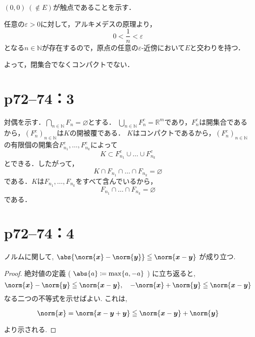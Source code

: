 \begin{tanswer}
    $(0,0)~(\notin E)$が触点であることを示す．

    任意の$\varepsilon >0$に対して，アルキメデスの原理より，
    \[
        0 < \frac{1}{n} < \varepsilon
    \]
    となる$n \in \mathbb{N}$が存在するので，原点の任意の$\varepsilon$-近傍において$E$と交わりを持つ．

    よって，閉集合でなくコンパクトでない．
\end{tanswer}


\newpage
\section*{p72--74：3}
\begin{tproof}
    対偶を示す．$\bigcap_{n \in \mathbb{N}}F_n = \varnothing$とする．
    $\bigcup_{n \in \mathbb{N}}F_n^c = \mathbb{R}^m$であり，$F_n^c$は開集合であるから，$(F_n^c)_{n \in \mathbb{N}}$は$K$の開被覆である．
    $K$はコンパクトであるから，$(F_n^c)_{n \in \mathbb{N}}$の有限個の開集合$F_{n_1}^c,\ldots,F_{n_k}^c$によって
    \[
        K \subset F_{n_1}^c \cup \ldots \cup F_{n_k}^c
    \]
    とできる．したがって，
    \[
        K \cap F_{n_1} \cap \ldots \cap F_{n_k} = \varnothing
    \]
    である．$K$は$F_{n_1},\ldots,F_{n_k}$をすべて含んでいるから，
    \[
        F_{n_1} \cap \ldots \cap F_{n_k} = \varnothing
    \]
    である．
\end{tproof}

\newpage

\section*{p72--74：4}

\begin{lemma}{}{}
    ノルムに関して, $\abs{\norm{ \bm{x}  }- \norm{ \bm{y} } } \leq \norm{ \bm{x} - \bm{y} }$ が成り立つ.
\end{lemma}

\begin{proof}
    絶対値の定義 ( $\abs{a} \coloneqq \max \{ a , -a \}$ ) に立ち返ると,
    \[
        \norm{ \bm{x}  }- \norm{ \bm{y} } \leq \norm{ \bm{x} - \bm{y} } ,\quad  - \norm{ \bm{x} } + \norm{ \bm{y} } \leq \norm{ \bm{x} - \bm{y} }
    \]
    なる二つの不等式を示せばよい. これは,

    \[
        \norm{ \bm{x} } = \norm{ \bm{x} - \bm{y} + \bm{y} } \leq \norm{ \bm x - \bm y } + \norm{ \bm{y} }
    \]

    より示される.
\end{proof}

